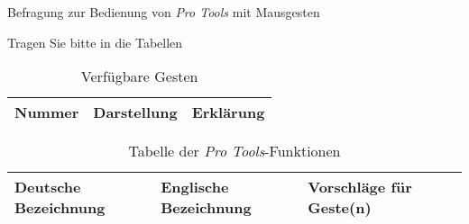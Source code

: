 \documentclass[11pt,a4paper,landscape,notitlepage]{article}
\begin{document}
\pagestyle{empty}
\begin{center}
\Large{Befragung zur Bedienung von \emph{Pro Tools} mit Mausgesten}
\end{center}

Tragen Sie bitte in die Tabellen 

\begin{table}[ht] \label{tab:Gestures}
\centering
\begin{tabular}{|l|l|l|} \hline
Nummer & Darstellung & Erklärung \\ \hline \hline
\end{tabular}
\caption{Verfügbare Gesten}
\end{table}

\begin{table}[ht] \label{tab:Functions}
\centering
\begin{tabular}{|l|l|l|l|} \hline
Deutsche Bezeichnung & Englische Bezeichnung & Vorschläge für Geste(n) & \\ \hline \hline
\end{tabular}
\caption{Tabelle der \emph{Pro Tools}-Funktionen}
\end{table}
\end{document}
